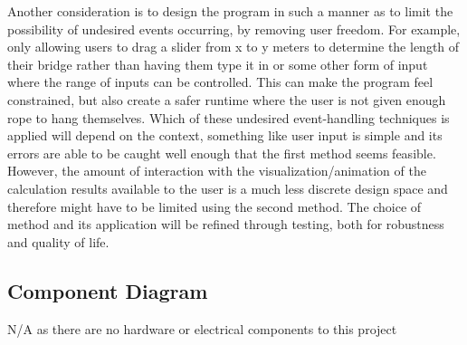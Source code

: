 \documentclass[12pt, titlepage]{article}
\begin{document}
Another consideration is to design the program in such a manner as to limit the possibility of undesired events occurring, by removing user freedom. For example, only allowing users to drag a slider from x to y meters to determine the length of their bridge rather than having them type it in or some other form of input where the range of inputs can be controlled. This can make the program feel constrained, but also create a safer runtime where the user is not given enough rope to hang themselves.
Which of these undesired event-handling techniques is applied will depend on the context, something like user input is simple and its errors are able to be caught well enough that the first method seems feasible. However, the amount of interaction with the visualization/animation of the calculation results available to the user is a much less discrete design space and therefore might have to be limited using the second method. The choice of method and its application will be refined through testing, both for robustness and quality of life.

\subsection{Component Diagram}
N/A as there are no hardware or electrical components to this project

\newpage
\end{document}

